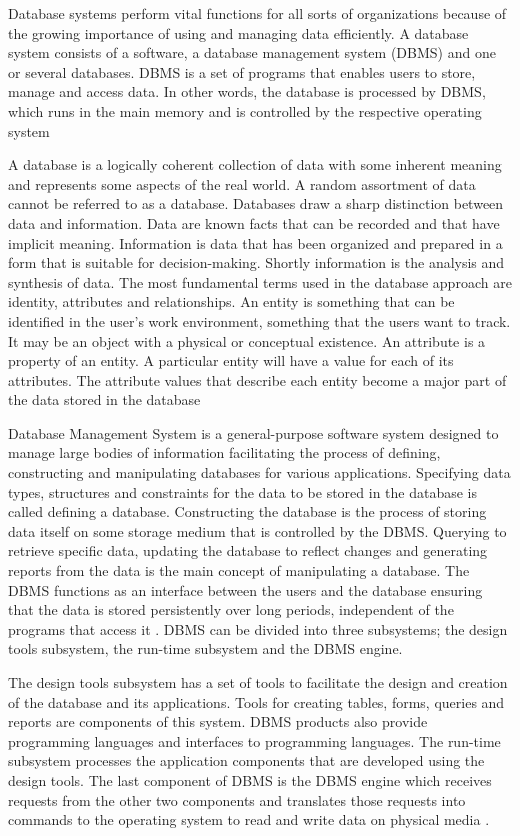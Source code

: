 Database systems perform vital functions for all sorts of organizations because
of the growing importance of using and managing data efficiently. A database
system consists of a software, a database management system (DBMS) and one or
several databases. DBMS is a set of programs that enables users to store, manage
and access data. In other words, the database is processed by DBMS, which runs
in the main memory and is controlled by the respective operating system

A database is a logically coherent collection of data with some inherent meaning
and represents some aspects of the real world. A random assortment of data
cannot be referred to as a database. Databases draw a sharp distinction between
data and information. Data are known facts that can be recorded and that have
implicit meaning. Information is data that has been organized and prepared in a
form that is suitable for decision-making. Shortly information is the analysis
and synthesis of data. The most fundamental terms used in the database approach
are identity, attributes and relationships. An entity is something that can be
identified in the user's work environment, something that the users want to
track. It may be an object with a physical or conceptual existence. An attribute
is a property of an entity. A particular entity will have a value for each of
its attributes. The attribute values that describe each entity become a major
part of the data stored in the database

Database Management System is a general-purpose software system designed to
manage large bodies of information facilitating the process of defining,
constructing and manipulating databases for various applications. Specifying
data types, structures and constraints for the data to be stored in the database
is called defining a database. Constructing the database is the process of
storing data itself on some storage medium that is controlled by the DBMS.
Querying to retrieve specific data, updating the database to reflect changes and
generating reports from the data is the main concept of manipulating a database.
The DBMS functions as an interface between the users and the database ensuring
that the data is stored persistently over long periods, independent of the
programs that access it \cite{latisen1998}. DBMS can be divided into three
subsystems; the design tools subsystem, the run-time subsystem and the DBMS
engine.

The design tools subsystem has a set of tools to facilitate the design and
creation of the database and its applications. Tools for creating tables, forms,
queries and reports are components of this system. DBMS products also provide
programming languages and interfaces to programming languages. The run-time
subsystem processes the application components that are developed using the
design tools. The last component of DBMS is the DBMS engine which receives
requests from the other two components and translates those requests into
commands to the operating system to read and write data on physical media
\cite{elmasri1998}.

